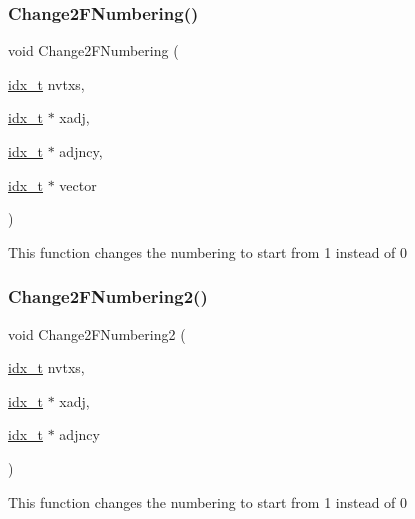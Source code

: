 \subsubsection{\texorpdfstring{Change2\+F\+Numbering()}{Change2FNumbering()}}
{\footnotesize\ttfamily void Change2\+F\+Numbering (\begin{DoxyParamCaption}\item[{\hyperlink{a00876_aaa5262be3e700770163401acb0150f52}{idx\+\_\+t}}]{nvtxs,  }\item[{\hyperlink{a00876_aaa5262be3e700770163401acb0150f52}{idx\+\_\+t} $\ast$}]{xadj,  }\item[{\hyperlink{a00876_aaa5262be3e700770163401acb0150f52}{idx\+\_\+t} $\ast$}]{adjncy,  }\item[{\hyperlink{a00876_aaa5262be3e700770163401acb0150f52}{idx\+\_\+t} $\ast$}]{vector }\end{DoxyParamCaption})}

This function changes the numbering to start from 1 instead of 0 \mbox{\label{a00945_a44197f7d5f06aa99a5633184e13773cd}} 
\subsubsection{\texorpdfstring{Change2\+F\+Numbering2()}{Change2FNumbering2()}}
{\footnotesize\ttfamily void Change2\+F\+Numbering2 (\begin{DoxyParamCaption}\item[{\hyperlink{a00876_aaa5262be3e700770163401acb0150f52}{idx\+\_\+t}}]{nvtxs,  }\item[{\hyperlink{a00876_aaa5262be3e700770163401acb0150f52}{idx\+\_\+t} $\ast$}]{xadj,  }\item[{\hyperlink{a00876_aaa5262be3e700770163401acb0150f52}{idx\+\_\+t} $\ast$}]{adjncy }\end{DoxyParamCaption})}

This function changes the numbering to start from 1 instead of 0 \mbox{\label{a00945_a32ee075cbfbbc16a0237908bca571c77}} 
